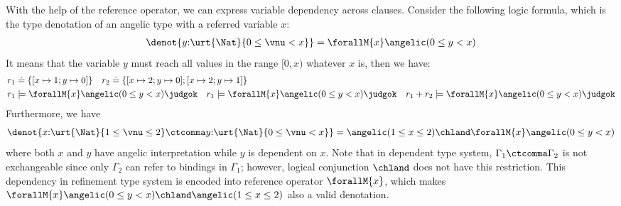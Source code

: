 \begin{definition}
\begin{example} With the help of the reference operator, we can express variable dependency across clauses. Consider the following logic formula, which is the type denotation of an angelic type with a referred variable $x$:
\begin{align*}
  \denot{y{:}\urt{\Nat}{0 \leq \vnu < x}} = \forallM{x} \angelic (0 \leq y < x)
\end{align*}\noindent
It means that the variable $y$ must reach all values in the range $[0, x)$ whatever $x$ is, then we have:
  \begin{align*}
    &r_1 \doteq \{[x \mapsto 1; y \mapsto 0]\} \quad r_2 \doteq \{[x \mapsto 2; y \mapsto 0]; [x \mapsto 2; y \mapsto 1] \}\\
    &r_1 \models \forallM{x} \angelic (0 \leq y < x) \judgok \quad r_1 \models \forallM{x} \angelic (0 \leq y < x)\judgok   \quad r_1 + r_2 \models \forallM{x} \angelic (0 \leq y < x)  \judgok 
  \end{align*}
Furthermore, we have
\begin{align*}
  \denot{x{:}\urt{\Nat}{1 \leq \vnu \leq 2} \ctcomma y{:}\urt{\Nat}{0 \leq \vnu < x}} =
  \angelic (1 \leq x \leq 2) \chland \forallM{x} \angelic (0 \leq y < x) 
\end{align*}\noindent
where both $x$ and $y$ have angelic interpretation while $y$ is dependent on $x$. Note that in dependent type system, $\Gamma_1 \ctcomma \Gamma_2$ is not exchangeable since only $\Gamma_2$ can refer to bindings in $\Gamma_1$; however, logical conjunction $\chland$ does not have this restriction. This dependency in refinement type system is encoded into reference operator $\forallM{x}$, which makes $\forallM{x} \angelic (0 \leq y < x) \chland \angelic (1 \leq x \leq 2)$ also a valid denotation.
\end{example}


\end{definition}
